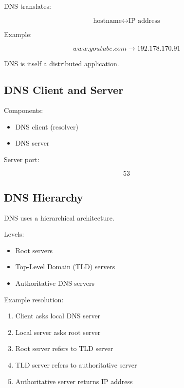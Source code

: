 DNS translates:

\[
\text{hostname} \leftrightarrow \text{IP address}
\]

Example:

\[
www.youtube.com \rightarrow 192.178.170.91
\]

DNS is itself a distributed application.

\subsection{DNS Client and Server}

Components:

\begin{itemize}
\item DNS client (resolver)
\item DNS server
\end{itemize}

Server port:

\[
53
\]

\subsection{DNS Hierarchy}

DNS uses a hierarchical architecture.

Levels:

\begin{itemize}
\item Root servers
\item Top-Level Domain (TLD) servers
\item Authoritative DNS servers
\end{itemize}

Example resolution:

\begin{enumerate}
\item Client asks local DNS server
\item Local server asks root server
\item Root server refers to TLD server
\item TLD server refers to authoritative server
\item Authoritative server returns IP address
\end{enumerate}


